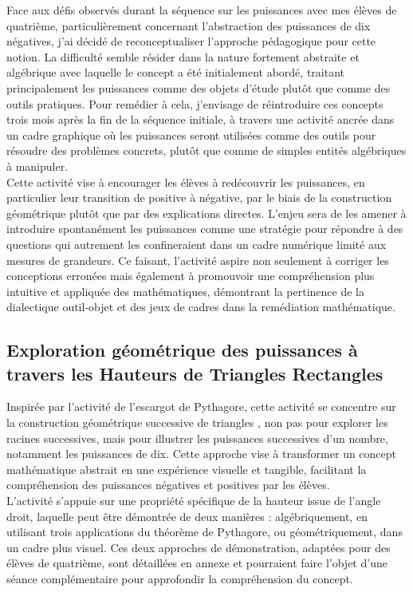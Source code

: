 Face aux défis observés durant la séquence sur les puissances avec mes élèves de quatrième,
particulièrement concernant l'abstraction des puissances de dix négatives,
j'ai décidé de reconceptualiser l'approche pédagogique pour cette notion.
La difficulté semble résider dans la nature fortement abstraite et algébrique avec laquelle le concept a été initialement abordé,
traitant principalement les puissances comme des objets d'étude plutôt que comme des outils pratiques.
Pour remédier à cela,
j'envisage de réintroduire ces concepts trois mois après la fin de la séquence initiale,
à travers une activité ancrée dans un cadre graphique où les puissances seront utilisées comme des outils pour résoudre des problèmes concrets,
plutôt que comme de simples entités algébriques à manipuler.\\

Cette activité vise à encourager les élèves à redécouvrir les puissances,
en particulier leur transition de positive à négative,
par le biais de la construction géométrique plutôt que par des explications directes.
L'enjeu sera de les amener à introduire spontanément les puissances comme une stratégie pour répondre à des questions qui autrement les confineraient dans un cadre numérique limité aux mesures de grandeurs.
Ce faisant,
l'activité aspire non seulement à corriger les conceptions erronées mais également à promouvoir une compréhension plus intuitive et appliquée des mathématiques,
démontrant la pertinence de la dialectique outil-objet et des jeux de cadres dans la remédiation mathématique.

\subsection{Exploration géométrique des puissances à travers les Hauteurs de Triangles Rectangles}

Inspirée par l'activité de l'escargot de Pythagore,
cette activité se concentre sur la construction géométrique successive de triangles \cite{villemin},
non pas pour explorer les racines successives,
mais pour illustrer les puissances successives d'un nombre,
notamment les puissances de dix.
Cette approche vise à transformer un concept mathématique abstrait en une expérience visuelle et tangible,
facilitant la compréhension des puissances négatives et positives par les élèves.\\

L'activité s'appuie sur une propriété spécifique de la hauteur issue de l'angle
droit, laquelle peut être démontrée de deux manières : algébriquement, en
utilisant trois applications du théorème de Pythagore, ou géométriquement, dans
un cadre plus visuel. Ces deux approches de démonstration, adaptées pour des
élèves de quatrième, sont détaillées en annexe et pourraient faire l'objet d'une
séance complémentaire pour approfondir la compréhension du concept.

